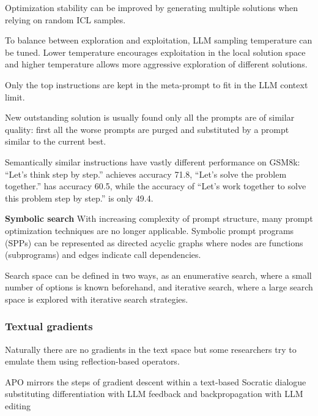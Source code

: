 Optimization stability can be improved by generating multiple solutions when relying on random ICL samples. \cite{yang2024largelanguagemodelsoptimizers}

To balance between exploration and exploitation, LLM sampling temperature can be tuned. Lower temperature encourages exploitation in the local solution space and higher temperature allows more aggressive exploration of different solutions. \cite{yang2024largelanguagemodelsoptimizers}

Only the top instructions are kept in the meta-prompt to fit in the LLM context limit. \cite{yang2024largelanguagemodelsoptimizers}

New outstanding solution is usually found only all the prompts are of similar quality: first all the worse prompts are purged and substituted by a prompt similar to the current best. \cite{yang2024largelanguagemodelsoptimizers}

Semantically similar instructions have vastly different performance on GSM8k: “Let’s think step by step.” achieves accuracy 71.8, “Let’s solve the problem together.” has accuracy 60.5, while the accuracy of “Let’s work together to solve this problem step by step.” is only 49.4. \cite{yang2024largelanguagemodelsoptimizers}





\textbf{Symbolic search}
With increasing complexity of prompt structure, many prompt optimization techniques are no longer applicable. \cite{schnabel2024symbolicpromptprogramsearch}
Symbolic prompt programs (SPPs) can be represented as directed acyclic graphs where nodes are functions (subprograms) and edges indicate call dependencies. \cite{schnabel2024symbolicpromptprogramsearch}

Search space can be defined in two ways, as an enumerative search, where a small number of options is known beforehand, and iterative search, where a large search space is explored with iterative search strategies. \cite{schnabel2024symbolicpromptprogramsearch}



\subsubsection{Textual gradients}
Naturally there are no gradients in the text space but some researchers try to emulate them using reflection-based operators.

APO mirrors the steps of gradient descent within a text-based Socratic dialogue substituting differentiation with LLM feedback and backpropagation with LLM editing \cite{pryzant2023automaticpromptoptimizationgradient}

